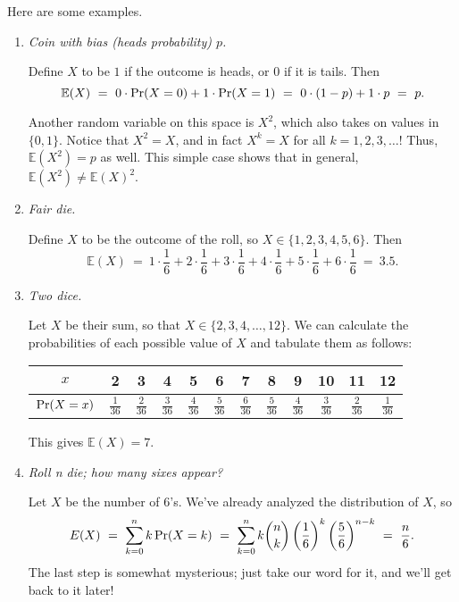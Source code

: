 \documentclass{report}
\theoremstyle{plain}
\theoremstyle{definition}
\newcommand{\E}{\mathbb{E}}
\newcommand{\pr}{\mbox{\rm Pr}}
\begin{document}
Here are some examples.
\begin{enumerate}
\item {\it Coin with bias (heads probability) $p$.}

Define $X$ to be $1$ if the outcome is heads, or $0$ if it is tails. Then 
$$ \E(X) 
\ = \ 
0 \cdot \pr(X = 0) + 1 \cdot \pr(X = 1)  
\ = \ 
0 \cdot (1-p) + 1 \cdot p
\ = \ 
p .
$$

Another random variable on this space is $X^2$, which also takes on values in $\{0,1\}$.
Notice that $X^2 = X$, and in fact $X^k = X$ for all $k = 1,2,3,\ldots$! Thus, 
$\E(X^2) = p$ as well. This simple case shows that in general, $\E(X^2) \neq \E(X)^2$.

\item {\it Fair die.}

Define $X$ to be the outcome of the roll, so $X \in \{1,2,3,4,5,6\}$. Then
$$ \E(X) 
\ = \ 
1 \cdot \frac{1}{6} + 2 \cdot \frac{1}{6} + 3 \cdot \frac{1}{6} + 4 \cdot \frac{1}{6}
+ 5 \cdot \frac{1}{6} + 6 \cdot \frac{1}{6} 
\ = \ 
3.5.$$

\item {\it Two dice.}

Let $X$ be their sum, so that $X \in \{2,3,4,\ldots, 12\}$. We can calculate the probabilities
of each possible value of $X$ and tabulate them as follows:

\begin{center}
\begin{tabular}{c|c|c|c|c|c|c|c|c|c|c|c}
$x$          & 2 & 3 & 4 & 5 & 6 & 7 & 8 & 9 & 10 & 11 & 12 \\ \hline
$\pr(X = x)$ & $\frac{1}{36}$ & $\frac{2}{36}$ & $\frac{3}{36}$ & $\frac{4}{36}$ & $\frac{5}{36}$ & $\frac{6}{36}$ & $\frac{5}{36}$ & $\frac{4}{36}$ & $\frac{3}{36}$ & $\frac{2}{36}$ & $\frac{1}{36}$  
\end{tabular}
\end{center}

This gives $\E(X) = 7$.

\item {\it Roll n die; how many sixes appear?}

Let $X$ be the number of $6$'s. We've already analyzed the distribution of $X$, so
$$ E(X) 
\ = \ 
\sum_{k = 0}^n k \, \pr(X = k)
\ = \ 
\sum_{k = 0}^n k {n \choose k} \left(\frac{1}{6} \right)^k \left( \frac{5}{6} \right)^{n-k}
\ = \ 
\frac{n}{6}.
$$
The last step is somewhat mysterious; just take our word for it, and we'll get back to it later!
\end{enumerate}
\end{document}
